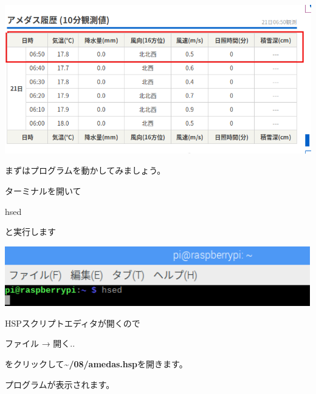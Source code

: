 \documentclass[a4paper,12pt,dvipdfmx]{jarticle}
\begin{document}
\begin{center}
\includegraphics[width=17.006cm]{textbook-img029-1.png}

\end{center}

\bigskip

\clearpage
まずはプログラムを動かしてみましょう。

ターミナルを開いて

hsed

と実行します



\begin{center}
\includegraphics[width=13.28cm]{textbook-img013.png}

\end{center}

\bigskip


\bigskip


\bigskip

HSPスクリプトエディタが開くので

ファイル → 開く..

をクリックして\textbf{{\textasciitilde}/08/amedas.hsp}を開きます。

プログラムが表示されます。
\end{document}
